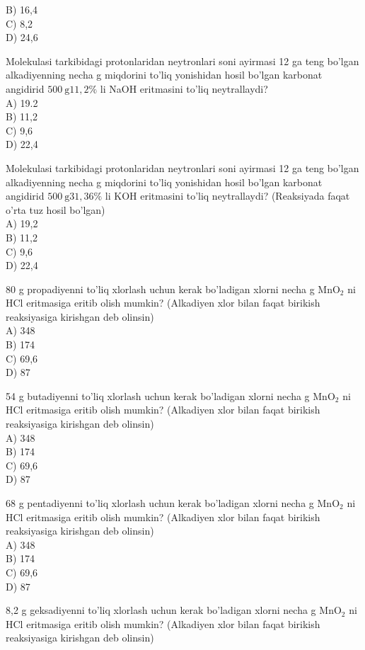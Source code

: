 B) 16,4\\
C) 8,2\\
D) 24,6
  \item Molekulasi tarkibidagi protonlaridan neytronlari soni ayirmasi 12 ga teng bo'lgan alkadiyenning necha g miqdorini to'liq yonishidan hosil bo'lgan karbonat angidirid $500 \mathrm{~g} 11,2 \%$ li NaOH eritmasini to'liq neytrallaydi?\\
A) 19.2\\
B) 11,2\\
C) 9,6\\
D) 22,4
  \item Molekulasi tarkibidagi protonlaridan neytronlari soni ayirmasi 12 ga teng bo'lgan alkadiyenning necha g miqdorini to'liq yonishidan hosil bo'lgan karbonat angidirid $500 \mathrm{~g} 31,36 \%$ li KOH eritmasini to'liq neytrallaydi? (Reaksiyada faqat o'rta tuz hosil bo'lgan)\\
A) 19,2\\
B) 11,2\\
C) 9,6\\
D) 22,4
  \item 80 g propadiyenni to'liq xlorlash uchun kerak bo'ladigan xlorni necha g $\mathrm{MnO}_{2}$ ni HCl eritmasiga eritib olish mumkin? (Alkadiyen xlor bilan faqat birikish reaksiyasiga kirishgan deb olinsin)\\
A) 348\\
B) 174\\
C) 69,6\\
D) 87
  \item 54 g butadiyenni to'liq xlorlash uchun kerak bo'ladigan xlorni necha g $\mathrm{MnO}_{2}$ ni HCl eritmasiga eritib olish mumkin? (Alkadiyen xlor bilan faqat birikish reaksiyasiga kirishgan deb olinsin)\\
A) 348\\
B) 174\\
C) 69,6\\
D) 87
  \item 68 g pentadiyenni to'liq xlorlash uchun kerak bo'ladigan xlorni necha g $\mathrm{MnO}_{2}$ ni HCl eritmasiga eritib olish mumkin? (Alkadiyen xlor bilan faqat birikish reaksiyasiga kirishgan deb olinsin)\\
A) 348\\
B) 174\\
C) 69,6\\
D) 87
  \item 8,2 g geksadiyenni to'liq xlorlash uchun kerak bo'ladigan xlorni necha g $\mathrm{MnO}_{2}$ ni HCl eritmasiga eritib olish mumkin? (Alkadiyen xlor bilan faqat birikish reaksiyasiga kirishgan deb olinsin)\\
